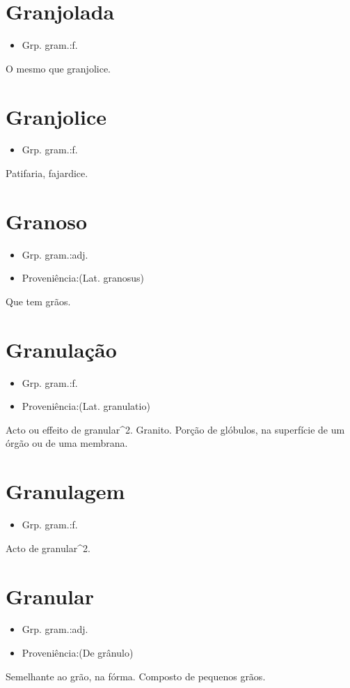 \section{Granjolada}
\begin{itemize}
\item {Grp. gram.:f.}
\end{itemize}
O mesmo que \textunderscore granjolice\textunderscore .
\section{Granjolice}
\begin{itemize}
\item {Grp. gram.:f.}
\end{itemize}
Patifaria, fajardice.
\section{Granoso}
\begin{itemize}
\item {Grp. gram.:adj.}
\end{itemize}
\begin{itemize}
\item {Proveniência:(Lat. \textunderscore granosus\textunderscore )}
\end{itemize}
Que tem grãos.
\section{Granulação}
\begin{itemize}
\item {Grp. gram.:f.}
\end{itemize}
\begin{itemize}
\item {Proveniência:(Lat. \textunderscore granulatio\textunderscore )}
\end{itemize}
Acto ou effeito de granular^2.
Granito.
Porção de glóbulos, na superfície de um órgão ou de uma membrana.
\section{Granulagem}
\begin{itemize}
\item {Grp. gram.:f.}
\end{itemize}
Acto de granular^2.
\section{Granular}
\begin{itemize}
\item {Grp. gram.:adj.}
\end{itemize}
\begin{itemize}
\item {Proveniência:(De \textunderscore grânulo\textunderscore )}
\end{itemize}
Semelhante ao grão, na fórma.
Composto de pequenos grãos.
